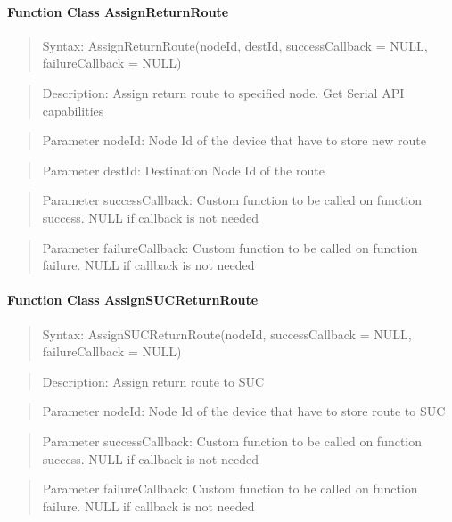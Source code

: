 \paragraph{Function Class AssignReturnRoute}
\begin{quote}Syntax: AssignReturnRoute(nodeId, destId, successCallback = NULL, failureCallback = NULL)\end{quote}
\begin{quote}Description: Assign return route to specified node. Get Serial API capabilities\end{quote}
\begin{quote}Parameter nodeId: Node Id of the device that have to store new route\end{quote}
\begin{quote}Parameter destId: Destination Node Id of the route\end{quote}
\begin{quote}Parameter successCallback: Custom function to be called on function success. NULL if callback is not needed\end{quote}
\begin{quote}Parameter failureCallback: Custom function to be called on function failure. NULL if callback is not needed\end{quote}


\paragraph{Function Class AssignSUCReturnRoute}
\begin{quote}Syntax: AssignSUCReturnRoute(nodeId, successCallback = NULL, failureCallback = NULL)\end{quote}
\begin{quote}Description: Assign return route to SUC\end{quote}
\begin{quote}Parameter nodeId: Node Id of the device that have to store route to SUC\end{quote}
\begin{quote}Parameter successCallback: Custom function to be called on function success. NULL if callback is not needed\end{quote}
\begin{quote}Parameter failureCallback: Custom function to be called on function failure. NULL if callback is not needed\end{quote}


